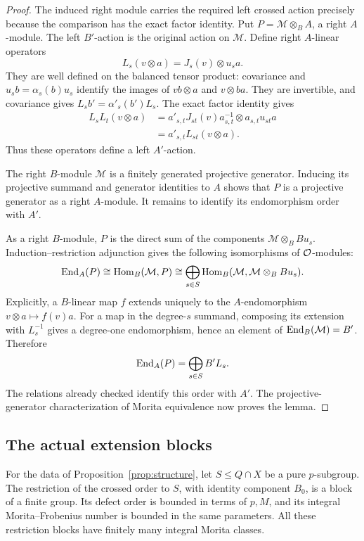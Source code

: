 \begin{proof}
The induced right module carries the required left crossed action
precisely because the comparison has the exact factor identity.
Put $P=\mathcal M\otimes_B A$, a right $A$-module.  The left
$B'$-action is the original action on $\mathcal M$.  Define
right $A$-linear operators
\[
 L_s(v\otimes a)=J_s(v)\otimes u_s a.
\]
They are well defined on the balanced tensor product: covariance
and $u_sb=\alpha_s(b)u_s$ identify the images of
$vb\otimes a$ and $v\otimes ba$.  They are invertible, and
covariance gives $L_s b'=\alpha'_s(b')L_s$.
The exact factor identity gives
\begin{align*}
 L_sL_t(v\otimes a)
 &=a'_{s,t}J_{st}(v)a_{s,t}^{-1}\otimes
                 a_{s,t}u_{st}a\\
 &=a'_{s,t}L_{st}(v\otimes a).
\end{align*}
Thus these operators define a left $A'$-action.

The right $B$-module $\mathcal M$ is a finitely generated
projective generator.  Inducing its projective summand and
generator identities to $A$ shows that $P$ is a projective
generator as a right $A$-module.  It remains to identify its
endomorphism order with $A'$.

As a right $B$-module, $P$ is the direct sum of the components
$\mathcal M\otimes_B Bu_s$.  Induction--restriction adjunction
gives the following isomorphisms of $\mathcal O$-modules:
\[
 \operatorname{End}_A(P)\cong\operatorname{Hom}_B(\mathcal M,P)
 \cong\bigoplus_{s\in S}
 \operatorname{Hom}_B(\mathcal M,\mathcal M\otimes_B Bu_s).
\]
Explicitly, a $B$-linear map $f$ extends uniquely to the
$A$-endomorphism $v\otimes a\mapsto f(v)a$.  For a map in
the degree-$s$ summand, composing its extension with $L_s^{-1}$
gives a degree-one endomorphism, hence an element of
$\operatorname{End}_B(\mathcal M)=B'$.  Therefore
\[
 \operatorname{End}_A(P)=\bigoplus_{s\in S}B'L_s.
\]
The relations already checked identify this order with $A'$.
The projective-generator characterization of Morita equivalence
now proves the lemma.
\end{proof}

\subsection{The actual extension blocks}

\begin{proposition}
\label{prop:sylow-block}
For the data of Proposition~\ref{prop:structure}, let
$S\leq Q\cap X$ be a pure $p$-subgroup.  The restriction of the
crossed order to $S$, with identity component $B_0$, is a block
of a finite group.  Its defect order is bounded in terms of
$p,M$, and its integral Morita--Frobenius number is bounded in
the same parameters.  All these restriction blocks have
finitely many integral Morita classes.
\end{proposition}

